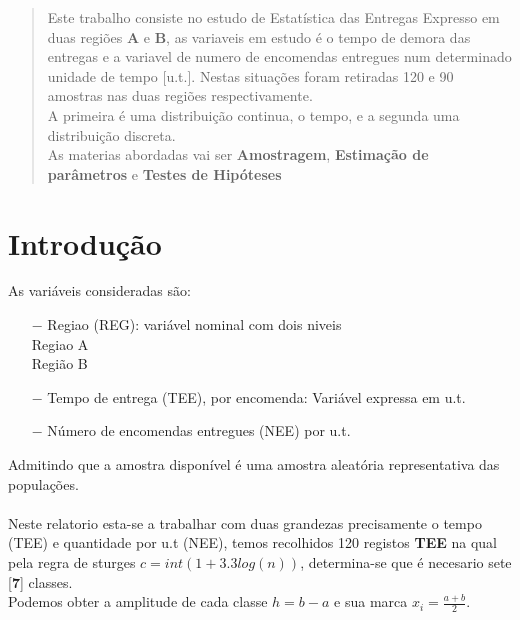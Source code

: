 
%

%
\tableofcontents
%
\appendix
%
\pagestyle{plain}%
\newpage
\label{Resumo}
\begin{abstract}
Este trabalho consiste no estudo de Estatística das Entregas Expresso em  duas regiões \textbf{A} e \textbf{B}, as variaveis em estudo é o tempo de demora das entregas e a variavel de numero de encomendas entregues num determinado unidade de tempo [u.t.]. Nestas situações foram retiradas 120 e 90 amostras nas duas regiões respectivamente.\\
A primeira é uma distribuição continua, o tempo, e a segunda uma distribuição discreta.
\\
As materias abordadas vai ser \textbf{Amostragem}, \textbf{Estimação de parâmetros} e \textbf{Testes de Hipóteses}\\
\end{abstract}
%
\newpage
\section{Introdução}\label{Introdução}
%
As variáveis consideradas são:
\begin{itemize}
\item[$-$] Regiao (REG): variável nominal com dois niveis\\
\qquad Regiao A \\
\qquad Região B
\item [$-$] Tempo de entrega (TEE), por encomenda: Variável expressa em u.t.
\item [$-$] Número de encomendas entregues (NEE) por u.t.
\end{itemize}
Admitindo que a amostra disponível é uma amostra aleatória representativa das populações.\\
\\
Neste relatorio esta-se a trabalhar com duas  grandezas precisamente o tempo (TEE) e quantidade por u.t (NEE), temos recolhidos 120 registos \textbf{TEE} na qual pela regra de sturges $c = int(1+3.3log(n))$, determina-se que é necesario sete [\textbf{7}] classes. \\
Podemos obter a amplitude de cada classe $h=b-a$ e sua marca $x_i=\frac{a+b}{2}$. \\
